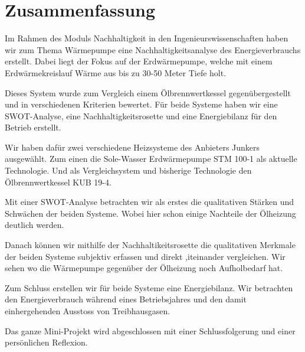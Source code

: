 \chapter*{Zusammenfassung}
\label{chap:zusammenfassung}

Im Rahmen des Moduls \glqq Nachhaltigkeit in den Ingenieurswissenschaften\grqq{} haben wir zum Thema Wärmepumpe eine Nachhaltigkeitsanalyse des Energieverbrauchs erstellt. Dabei liegt der Fokus auf der Erdwärmepumpe, welche mit einem Erdwärmekreislauf Wärme aus bis zu 30-50 Meter Tiefe holt.

Dieses System wurde zum Vergleich einem Ölbrennwertkessel gegenübergestellt und in verschiedenen Kriterien bewertet. Für beide Systeme haben wir eine SWOT-Analyse, eine Nachhaltigkeitsrosette und eine Energiebilanz für den Betrieb erstellt.

Wir haben dafür zwei verschiedene Heizsysteme des Anbieters Junkers ausgewählt.
Zum einen die Sole-Wasser Erdwärmepumpe \glqq STM 100-1\grqq{} als aktuelle Technologie.
Und als Vergleichsystem und bisherige Technologie den Ölbrennwertkessel \glqq KUB 19-4\grqq{}.

Mit einer SWOT-Analyse betrachten wir als erstes die qualitativen Stärken und
Schwächen der beiden Systeme. Wobei hier schon einige Nachteile der Ölheizung
deutlich werden.

Danach können wir mithilfe der Nachhaltikeitsrosette die qualitativen Merkmale
der beiden Systeme subjektiv erfassen und direkt ,iteinander vergleichen.
Wir sehen wo die Wärmepumpe gegenüber der Ölheizung noch Aufholbedarf hat.

Zum Schluss erstellen wir für beide Systeme eine Energiebilanz.
Wir betrachten den Energieverbrauch während eines Betriebsjahres und den
damit einhergehenden Ausstoss von Treibhausgasen.

Das ganze Mini-Projekt wird abgeschlossen mit einer Schlussfolgerung und einer persönlichen Reflexion.



